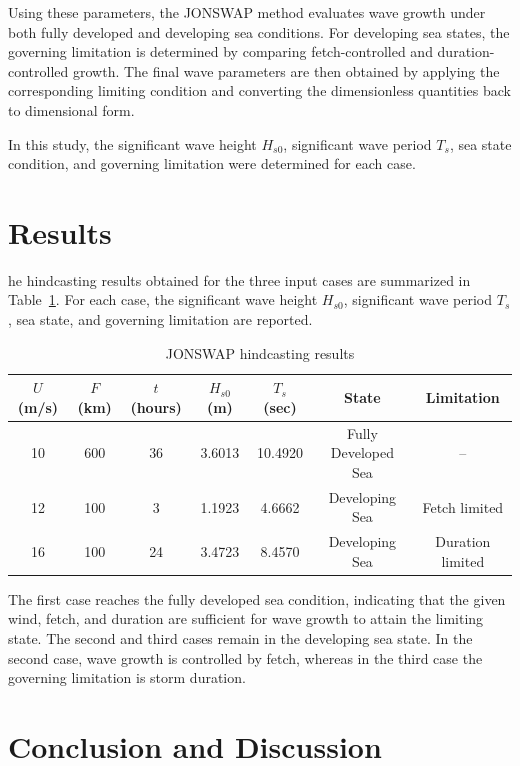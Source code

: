 \documentclass[a4paper, 11pt]{article}
\begin{document}
Using these parameters, the JONSWAP method evaluates wave growth under both fully developed and developing sea conditions. For developing sea states, the governing limitation is determined by comparing fetch-controlled and duration-controlled growth. The final wave parameters are then obtained by applying the corresponding limiting condition and converting the dimensionless quantities back to dimensional form.

In this study, the significant wave height \(H_{s0}\), significant wave period \(T_s\), sea state condition, and governing limitation were determined for each case.


\section{Results}

\hspace{0.5cm}he hindcasting results obtained for the three input cases are summarized in Table~\ref{tab:results}. For each case, the significant wave height \(H_{s0}\), significant wave period \(T_s\), sea state, and governing limitation are reported.

\begin{table}[H]
\centering
\caption{JONSWAP hindcasting results}
\label{tab:results}
\begin{tabular}{ccccccc}
\hline
$U$ (m/s) & $F$ (km) & $t$ (hours) & $H_{s0}$ (m) & $T_s$ (sec) & State & Limitation \\
\hline
10 & 600 & 36 & 3.6013 & 10.4920 & Fully Developed Sea & -- \\
12 & 100 & 3  & 1.1923 & 4.6662 & Developing Sea & Fetch limited \\
16 & 100 & 24 & 3.4723 & 8.4570 & Developing Sea & Duration limited \\
\hline
\end{tabular}
\end{table}

The first case reaches the fully developed sea condition, indicating that the given wind, fetch, and duration are sufficient for wave growth to attain the limiting state. The second and third cases remain in the developing sea state. In the second case, wave growth is controlled by fetch, whereas in the third case the governing limitation is storm duration.

\section{Conclusion and Discussion}
\end{document}
